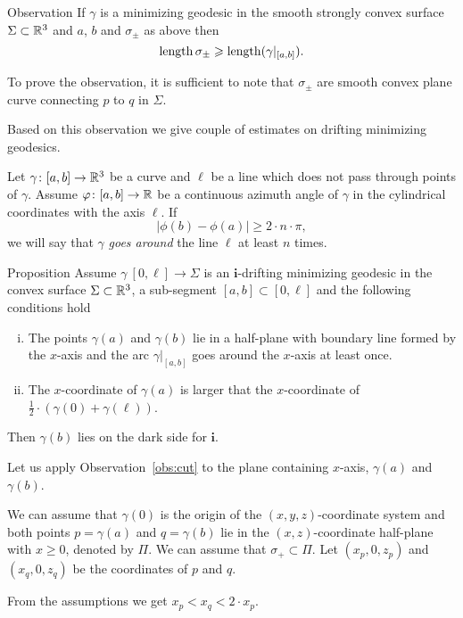 \documentclass[a4paper,10pt]{amsart}
\begin{document}
\begin{thm}{Observation}\label{obs:cut}
If $\gamma$ is a minimizing geodesic in the smooth strongly convex surface $\Sigma\subset \mathbb{R}^3$ and $a$, $b$ and $\sigma_\pm$ as above then
\[\mathop{\rm length}\nolimits\sigma_\pm\geqslant\mathop{\rm length}\nolimits(\gamma|_{[a,b]}).\]
\end{thm}

To prove the observation, it is sufficient to note that $\sigma_\pm$ are  smooth convex plane curve connecting $p$ to $q$ in $\Sigma$.

Based on this observation we give couple of estimates on drifting minimizing geodesics.

Let $\gamma\colon[a,b]\to\mathbb{R}^3$ be a curve and $\ell$ be a line which does not pass through points of $\gamma$.
Assume $\varphi\colon[a,b]\to\mathbb{R}$ be a continuous azimuth angle
of $\gamma$ in the cylindrical coordinates with the axis $\ell$.
If 
\[|\phi(b)-\phi(a)|\ge 2\cdot n\cdot\pi,\]
we will say that $\gamma$ \emph{goes around} the line $\ell$
at least $n$ times.

\begin{thm}{Proposition}\label{prop:around-once}
Assume $\gamma\:[0,\ell]\to \Sigma$ is an $\bm{i}$-drifting minimizing geodesic in the convex surface $\Sigma\subset \mathbb{R}^3$, a sub-segment $[a,b]\subset [0,\ell]$ and the following conditions hold
\begin{enumerate}[(i)]
\item The points $\gamma(a)$ and $\gamma(b)$ lie in a half-plane with boundary line formed by the $x$-axis
and  the arc $\gamma|_{[a,b]}$ goes around the $x$-axis at least once.
\item  The $x$-coordinate of $\gamma(a)$ is larger that the $x$-coordinate of $\tfrac12\cdot(\gamma(0)+\gamma(\ell))$.
\end{enumerate}
Then  $\gamma(b)$ lies on the dark side for $\bm{i}$.
\end{thm}

Let us apply Observation~\ref{obs:cut} to the plane containing $x$-axis, $\gamma(a)$ and $\gamma(b)$.


We can assume that $\gamma(0)$ is the origin of the $(x,y,z)$-coordinate system
and both points $p=\gamma(a)$ and $q=\gamma(b)$ lie in the $(x,z)$-coordinate half-plane with $x\ge 0$, denoted by $\Pi$.
We can assume that $\sigma_+\subset \Pi$.
Let $(x_p,0,z_p)$ and $(x_q,0,z_q)$ be the coordinates of $p$ and $q$.

From the assumptions we get $x_p<x_q<2\cdot x_p$.
\end{document}
